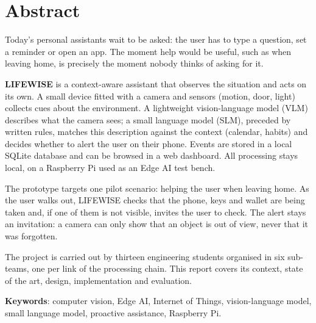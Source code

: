 \chapter*{\textcolor{mycolor}{Abstract}}

Today's personal assistants wait to be asked: the user has to type a question, set a reminder or open an app. The
moment help would be useful, such as when leaving home, is precisely the moment nobody thinks of asking for it.

\textbf{LIFEWISE} is a context-aware assistant that observes the situation and acts on its own. A small device
fitted with a camera and sensors (motion, door, light) collects cues about the environment. A lightweight
vision-language model (VLM) describes what the camera sees; a small language model (SLM), preceded by written
rules, matches this description against the context (calendar, habits) and decides whether to alert the user on
their phone. Events are stored in a local SQLite database and can be browsed in a web dashboard. All processing
stays local, on a Raspberry Pi used as an Edge AI test bench.

The prototype targets one pilot scenario: helping the user when leaving home. As the user walks out, LIFEWISE
checks that the phone, keys and wallet are being taken and, if one of them is not visible, invites the user to
check. The alert stays an invitation: a camera can only show that an object is out of view, never that it was
forgotten.

The project is carried out by thirteen engineering students organised in six sub-teams, one per link of the
processing chain. This report covers its context, state of the art, design, implementation and evaluation.

\vspace{1cm}

\noindent\textbf{Keywords}: computer vision, Edge AI, Internet of Things, vision-language model, small language
model, proactive assistance, Raspberry Pi.

